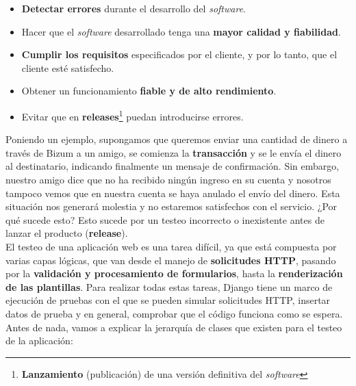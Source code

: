     \begin{itemize}
        \item \textbf{Detectar errores} durante el desarrollo del \textit{software}.
        \item Hacer que el \textit{software} desarrollado tenga una \textbf{mayor calidad y
        fiabilidad}.
        \item \textbf{Cumplir los requisitos} especificados por el cliente, y por lo tanto,
        que el cliente esté satisfecho.
        \item Obtener un funcionamiento \textbf{fiable y de alto rendimiento}.
        \item Evitar que en \textbf{releases}\footnote{\textbf{Lanzamiento} (publicación)
        de una versión definitiva del \textit{software}} puedan introducirse errores.
    \end{itemize}

Poniendo un ejemplo, supongamos que queremos enviar una cantidad de dinero a través de
Bizum a un amigo, se comienza la \textbf{transacción} y se le envía el dinero al
destinatario, indicando finalmente un mensaje de confirmación. Sin embargo, nuestro amigo
dice que no ha recibido ningún ingreso en su cuenta y nosotros tampoco vemos que en nuestra
cuenta se haya anulado el envío del dinero. Esta situación nos generará molestia y no
estaremos satisfechos con el servicio. ¿Por qué sucede esto? Esto sucede por un testeo
incorrecto o inexistente antes de lanzar el producto (\textbf{release}).\\

El testeo de una aplicación web es una tarea difícil, ya que está compuesta por varias
capas lógicas, que van desde el manejo de \textbf{solicitudes HTTP}, pasando por la
\textbf{validación y procesamiento de formularios}, hasta la \textbf{renderización de las
plantillas}. Para realizar todas estas tareas, Django tiene un marco de ejecución de
pruebas con el que se pueden simular solicitudes HTTP, insertar datos de prueba y en
general, comprobar que el código funciona como se espera.\\

Antes de nada, vamos a explicar la jerarquía de clases que existen para el testeo de la
aplicación:

